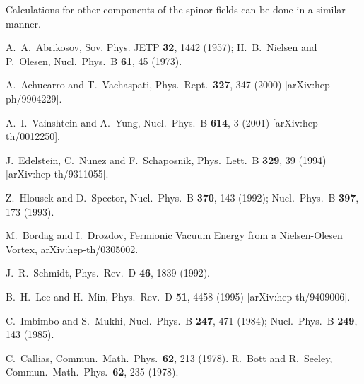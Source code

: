 \documentclass[a4paper,12pt]{article}
\begin{document}
Calculations for other components of the spinor fields can be done
in a similar manner. 
\begin{thebibliography}{99}
A.~A.~Abrikosov, Sov. Phys. JETP {\bf 32}, 1442 (1957);
H.~B.~Nielsen and P.~Olesen,
Nucl.\ Phys.\ B {\bf 61}, 45 (1973).

A.~Achucarro and T.~Vachaspati,
Phys.\ Rept.\  {\bf 327}, 347 (2000)
[arXiv:hep-ph/9904229].

A.~I.~Vainshtein and A.~Yung,
Nucl.\ Phys.\ B {\bf 614}, 3 (2001)
[arXiv:hep-th/0012250].

J.~Edelstein, C.~Nunez and F.~Schaposnik,
Phys.\ Lett.\ B {\bf 329}, 39 (1994)
[arXiv:hep-th/9311055].

Z.~Hlousek and D.~Spector,
Nucl.\ Phys.\ B {\bf 370}, 143 (1992);
Nucl.\ Phys.\ B {\bf 397}, 173 (1993).

M.~Bordag and I.~Drozdov, 
Fermionic Vacuum Energy from a Nielsen-Olesen Vortex,
arXiv:hep-th/0305002.

J.~R.~Schmidt,
Phys.\ Rev.\ D {\bf 46}, 1839 (1992).


B.~H.~Lee and H.~Min,
Phys.\ Rev.\ D {\bf 51}, 4458 (1995)
[arXiv:hep-th/9409006].

C.~Imbimbo and S.~Mukhi,
Nucl.\ Phys.\ B {\bf 247}, 471 (1984);
Nucl.\ Phys.\ B {\bf 249}, 143 (1985).

C.~Callias,
Commun.\ Math.\ Phys.\  {\bf 62}, 213 (1978).
R.~Bott and R.~Seeley,
Commun.\ Math.\ Phys.\  {\bf 62}, 235 (1978).


\end{thebibliography}
\end{document}
